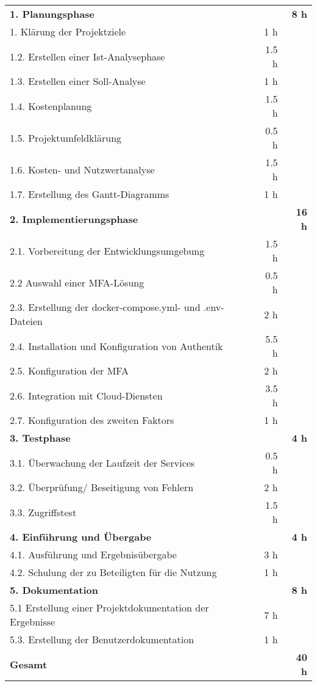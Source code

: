 \begin{tabularx}{\textwidth}{Xrrr}
\rowcolor{heading}\textbf{1. Planungsphase} & \textbf{} & \textbf{} & \textbf{8 h} \\
1. Klärung der Projektziele &       &   1 h   &  \\
\rowcolor{odd}1.2. Erstellen einer Ist-Analysephase &       &    1.5 h   &  \\
1.3. Erstellen einer Soll-Analyse &       &    1 h    &  \\
\rowcolor{odd}1.4. Kostenplanung &       &   1.5 h   &  \\
1.5. Projektumfeldklärung &       &    0.5 h   &  \\
\rowcolor{odd}1.6. Kosten- und Nutzwertanalyse &       &    1.5 h   &  \\
1.7. Erstellung des Gantt-Diagramms &        &    1 h     &   \\
\rowcolor{heading}\textbf{2. Implementierungsphase} & \textbf{} & \textbf{} & \textbf{16 h} \\
2.1. Vorbereitung der Entwicklungsumgebung &       &    1.5 h   &  \\
\rowcolor{odd}2.2 Auswahl einer \acs*{MFA}-Lösung  &       &    0.5 h   &  \\
2.3. Erstellung der docker-compose.yml- und .env-Dateien &       &   2 h    &  \\
\rowcolor{odd}2.4. Installation und Konfiguration von Authentik &      &   5.5 h    &  \\
2.5. Konfiguration der \acs*{MFA} &       &   2 h   &  \\
\rowcolor{odd}2.6. Integration mit Cloud-Diensten &     &   3.5 h    &  \\
2.7. Konfiguration des zweiten Faktors &       &    1 h    &   \\
\rowcolor{heading}\textbf{3. Testphase} & \textbf{} & \textbf{} & \textbf{4 h} \\
3.1. Überwachung der Laufzeit der Services &       &    0.5 h    &  \\
\rowcolor{odd}3.2. Überprüfung/ Beseitigung von Fehlern &       &    2 h   &  \\
3.3. Zugriffstest &        &    1.5 h   &    \\
\rowcolor{heading}\textbf{4. Einführung und Übergabe} & \textbf{} & \textbf{} & \textbf{4 h} \\
4.1. Ausführung und Ergebnisübergabe &       &    3 h   &  \\
\rowcolor{odd}4.2. Schulung der zu Beteiligten für die Nutzung &      &   1 h   &    \\
\rowcolor{heading}\textbf{5. Dokumentation} & \textbf{} & \textbf{} & \textbf{8 h} \\
5.1 Erstellung einer Projektdokumentation der Ergebnisse &       &   7 h   &  \\
\rowcolor{odd}5.3. Erstellung der Benutzerdokumentation &       &    1 h   &    \\
\hline
\hline
\rowcolor{heading}\textbf{Gesamt} & \textbf{} & \textbf{} & \textbf{40 h} \\
\end{tabularx}
